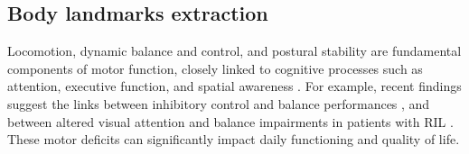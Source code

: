 
	



\subsection{Body landmarks extraction}

Locomotion, dynamic balance and control, and postural stability are fundamental components of motor function, closely linked to cognitive processes such as attention, executive function, and spatial awareness \cite{vanderVeen2023, Joseph2020}. For example, recent findings suggest the links between inhibitory control and balance performances \cite{Divandari2024}, and between altered visual attention and balance impairments in patients with RIL \cite{Bargiotas2019}. These motor deficits can significantly impact daily functioning and quality of life.

